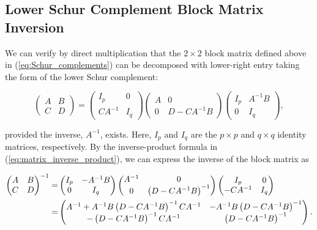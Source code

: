 \documentclass[12pt, twoside, draft]{article}
\begin{document}
\subsection{Lower Schur Complement Block Matrix Inversion}\label{sec:lower-schur}
We can verify by direct multiplication that the $2 \times 2$ block matrix defined above in (\ref{eq:Schur_complements}) can be decomposed with lower-right entry taking the form of the lower Schur complement:

\begin{equation}\label{eq:block_matrix_decomposition_lower}
\begin{pmatrix}
A & B \\
C & D
\end{pmatrix} = 
\begin{pmatrix}
I_p & 0 \\
CA^{-1} & I_q
\end{pmatrix}
\begin{pmatrix}
A & 0 \\
0 & D - CA^{-1}B
\end{pmatrix}
\begin{pmatrix}
I_p & A^{-1}B \\
0 & I_q
\end{pmatrix},
\end{equation}

provided the inverse, $A^{-1}$, exists.  Here, $I_p$ and $I_q$ are the $p \times p$ and $q \times q$ identity matrices, respectively.  By the inverse-product formula in (\ref{eq:matrix_inverse_product}), we can express the inverse of the block matrix as

\begin{align}\label{eq:block_matrix_inverse_lower}
\begin{pmatrix}
A & B \\
C & D
\end{pmatrix}^{-1} = &
\begin{pmatrix}
I_p & -A^{-1}B \\
0 & I_q
\end{pmatrix}
\begin{pmatrix}
A^{-1} & 0 \\
0 & \left( D - CA^{-1}B \right)^{-1}
\end{pmatrix}
\begin{pmatrix}
I_p & 0 \\
-CA^{-1} & I_q
\end{pmatrix} \notag \\
= & \begin{pmatrix}
A^{-1} + A^{-1}B \left( D - CA^{-1}B \right)^{-1} CA^{-1} & -A^{-1}B \left( D - CA^{-1}B \right)^{-1} \\
-\left( D - CA^{-1}B \right)^{-1}CA^{-1} & \left( D - CA^{-1}B \right)^{-1}
\end{pmatrix}.
\end{align}
\end{document}
